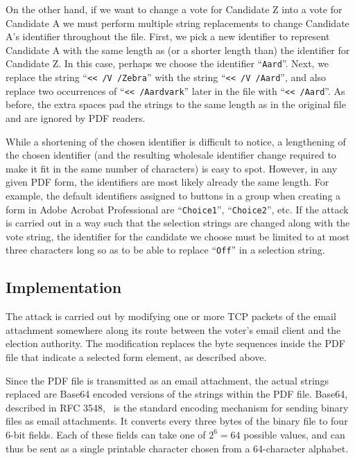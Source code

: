 \documentclass{article}
\newcommand{\etc}{etc.\xspace}
\begin{document}
On the other hand, if we want to change a vote for Candidate Z into a
vote for Candidate A we must perform multiple string replacements to
change Candidate A's identifier throughout the file.  First, we pick a
new identifier to represent Candidate A with the same length as (or a
shorter length than) the identifier for Candidate Z. In this case,
perhaps we choose the identifier ``\texttt{Aard}''. Next, we replace
the string ``\texttt{<{}< /V /Zebra}'' with the string ``\texttt{<{}<
  /V /Aard\textvisiblespace}'', and also replace two occurrences of
``\texttt{<{}< /Aardvark}'' later in the file with ``\texttt{<{}<
  /Aard\textvisiblespace\textvisiblespace\textvisiblespace\textvisiblespace}''. As
before, the extra spaces pad the strings to the same length as in the
original file and are ignored by PDF readers.

While a shortening of the chosen identifier is difficult to notice, a
lengthening of the chosen identifier (and the resulting wholesale
identifier change required to make it fit in the same number of
characters) is easy to spot. However, in any given PDF form, the
identifiers are most likely already the same length. For example, the
default identifiers assigned to buttons in a group when creating a
form in Adobe Acrobat Professional are ``\texttt{Choice1}'',
``\texttt{Choice2}'', \etc If the attack is carried out in a way such
that the selection strings are changed along with the vote string, the
identifier for the candidate we choose must be limited to at most
three characters long so as to be able to replace ``\texttt{Off}'' in
a selection string.


\subsection{Implementation}

The attack is carried out by modifying one or more TCP packets of the
email attachment somewhere along its route between the voter's email
client and the election authority. The modification replaces the byte
sequences inside the PDF file that indicate a selected form element,
as described above.

Since the PDF file is transmitted as an email attachment, the actual
strings replaced are Base64 encoded versions of the strings within the
PDF file. Base64, described in RFC 3548,~\cite{RFC3548} is the
standard encoding mechanism for sending binary files as email
attachments. It converts every three bytes of the binary file to four
6-bit fields. Each of these fields can take one of $2^6=64$ possible
values, and can thus be sent as a single printable character chosen
from a 64-character alphabet. 
\end{document}
